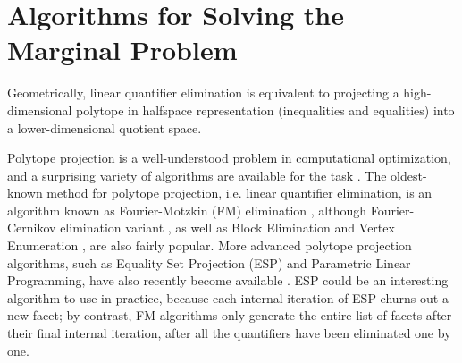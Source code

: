 \section{Algorithms for Solving the Marginal Problem}\label{sec:projalgorithms}


Geometrically, linear quantifier elimination is equivalent to projecting a high-dimensional polytope in halfspace representation (inequalities and equalities) into a lower-dimensional quotient space.

Polytope projection is a well-understood problem in computational optimization, and a surprising variety of algorithms are available for the task \cite{jones2004equality,JonesThesis2005,Jones2008}. The oldest-known method for polytope projection, i.e. linear quantifier elimination, is an algorithm known as Fourier-Motzkin (FM) elimination \cite{fordan1999projection,DantzigEaves}, although Fourier-Cernikov elimination variant \cite{Shapot2012,Bastrakov2015}, as well as Block Elimination and Vertex Enumeration \cite{Avis2000lrs}, are also fairly popular. More advanced polytope projection algorithms, such as Equality Set Projection (ESP) and Parametric Linear Programming, have also recently become available \cite{jones2004equality,JonesThesis2005,Jones2008}. ESP could be an interesting algorithm to use in practice, because each internal iteration of ESP churns out a new facet; by contrast, FM algorithms only generate the entire list of facets after their final internal iteration, after all the quantifiers have been eliminated one by one.

